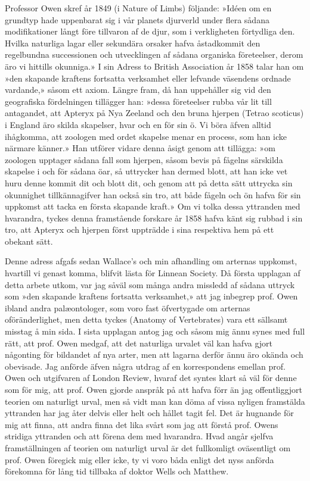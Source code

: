 Professor Owen skref år 1849 (i Nature of Limbs) följande: »Idéen om en grundtyp hade uppenbarat sig i vår planets djurverld under flera sådana modifikationer långt före tillvaron af de djur, som i verkligheten förtydliga den. Hvilka naturliga lagar eller sekundära orsaker hafva åstadkommit den regelbundna successionen och utvecklingen af sådana organiska företeelser, derom äro vi hittills okunniga.» I sin Adress to British Association år 1858 talar han om »den skapande kraftens fortsatta verksamhet eller lefvande väsendens ordnade vardande,» såsom ett axiom. Längre fram, då han uppehåller sig vid den geografiska fördelningen tillägger han: »dessa företeelser rubba vår lit till antagandet, att Apteryx på Nya Zeeland och den bruna hjerpen (Tetrao scoticus) i England äro skilda skapelser, hvar och en för sin ö. Vi böra äfven alltid ihågkomma, att zoologen med ordet skapelse menar en process, som han icke närmare känner.» Han utförer vidare denna åsigt genom att tillägga: »om zoologen upptager sådana fall som hjerpen, såsom bevis på fågelns särskilda skapelse i och för sådana öar, så uttrycker han dermed blott, att han icke vet huru denne kommit dit och blott dit, och genom att på detta sätt uttrycka sin okunnighet tillkännagifver han också sin tro, att både fågeln och ön hafva för sin uppkomst att tacka en första skapande kraft.» Om vi tolka dessa yttranden med hvarandra, tyckes denna framstående forskare år 1858 hafva känt sig rubbad i sin tro, att Apteryx och hjerpen först uppträdde i sina respektiva hem på ett obekant sätt.

Denne adress afgafs sedan Wallace’s och min afhandling om arternas uppkomst, hvartill vi genast komma, blifvit lästa för Linnean Society. Då första upplagan af detta arbete utkom, var jag såväl som många andra missledd af sådana uttryck som »den skapande kraftens fortsatta verksamhet,» att jag inbegrep prof. Owen ibland andra palæontologer, som voro fast öfvertygade om arternas oföränderlighet, men detta tyckes (Anatomy of Vertebrates) vara ett sällsamt misstag å min sida. I sista upplagan antog jag och såsom mig ännu synes med full rätt, att prof. Owen medgaf, att det naturliga urvalet väl kan hafva gjort någonting för bildandet af nya arter, men att lagarna derför ännu äro okända och obevisade. Jag anförde äfven några utdrag af en korrespondens emellan prof. Owen och utgifvaren af London Review, hvaraf det syntes klart så väl för denne som för mig, att prof. Owen gjorde anspråk på att hafva förr än jag offentliggjort teorien om naturligt urval, men så vidt man kan döma af vissa nyligen framstälda yttranden har jag åter delvis eller helt och hållet tagit fel. Det är hugnande för mig att finna, att andra finna det lika svårt som jag att förstå prof. Owens stridiga yttranden och att förena dem med hvarandra. Hvad angår sjelfva framställningen af teorien om naturligt urval är det fullkomligt oväsentligt om prof. Owen föregick mig eller icke, ty vi voro båda enligt det nyss anförda förekomna för lång tid tillbaka af doktor Wells och Matthew.

